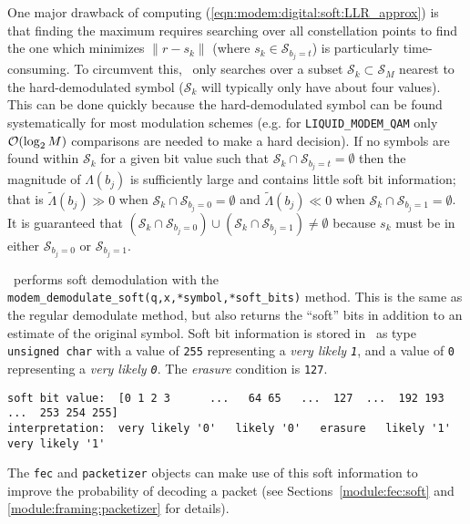 % 
%
One major drawback of computing
(\ref{eqn:modem:digital:soft:LLR_approx}) is that finding the maximum
requires searching over all constellation points to find the one which
minimizes $\|r-s_k\|$
(where $s_k \in \mathcal{S}_{b_j=t}$) is particularly time-consuming.
To circumvent this, \liquid\ only searches over a subset
$\mathcal{S}_k \subset \mathcal{S}_M$ nearest to the
hard-demodulated symbol
($\mathcal{S}_k$ will typically only have about four values).
This can be done quickly because the hard-demodulated symbol can be
found systematically for most modulation schemes
(e.g. for {\tt LIQUID\_MODEM\_QAM} only $\mathcal{O}(\log_2 M)$ comparisons are
needed to make a hard decision).
%
If no symbols are found within $\mathcal{S}_k$ for a given bit value
such that $\mathcal{S}_k \cap \mathcal{S}_{b_j=t} = \emptyset$
then the magnitude of $\Lambda(b_j)$ is sufficiently large
and contains little soft bit information;
that is
$\tilde{\Lambda}(b_j) \gg 0$ when $\mathcal{S}_k \cap \mathcal{S}_{b_j=0} = \emptyset$
and
$\tilde{\Lambda}(b_j) \ll 0$ when $\mathcal{S}_k \cap \mathcal{S}_{b_j=1} = \emptyset$.
%
It is guaranteed that
$   \left( \mathcal{S}_k \cap \mathcal{S}_{b_j=0}\right)
        \cup
    \left( \mathcal{S}_k \cap \mathcal{S}_{b_j=1}\right)
    \neq \emptyset $
because $s_k$ must be in either $\mathcal{S}_{b_j=0}$ or
$\mathcal{S}_{b_j=1}$.
%

% 
%
\liquid\ performs soft demodulation with the
{\tt modem\_demodulate\_soft(q,x,*symbol,*soft\_bits)} method.
This is the same as the regular demodulate method,
but also returns the ``soft'' bits in addition to an estimate of the
original symbol.
Soft bit information is stored in \liquid\ as type {\tt unsigned char}
with a value of {\tt 255} representing a {\em very likely {\tt 1}},
and a value of {\tt 0} representing a {\em very likely {\tt 0}}.
The {\em erasure} condition is {\tt 127}.
%
\begin{Verbatim}[fontsize=\small]
soft bit value:  [0 1 2 3      ...   64 65   ...  127  ...  192 193   ...  253 254 255]
interpretation:  very likely '0'   likely '0'   erasure   likely '1'    very likely '1'
\end{Verbatim}
%
The {\tt fec}  and {\tt packetizer} objects can make use of this soft
information to improve the probability of decoding a packet
(see Sections~\ref{module:fec:soft} and
\ref{module:framing:packetizer} for details).

